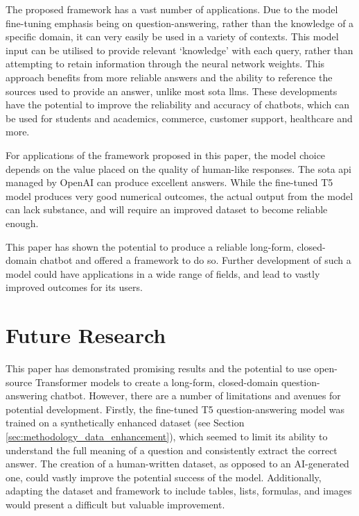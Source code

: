 The proposed framework has a vast number of applications. Due to the model fine-tuning emphasis being on question-answering, rather than the knowledge of a specific domain, it can very easily be used in a variety of contexts. This model input can be utilised to provide relevant `knowledge' with each query, rather than attempting to retain information through the neural network weights. This approach benefits from more reliable answers and the ability to reference the sources used to provide an answer, unlike most \acrlong{sota} \acrshort{llm}s. These developments have the potential to improve the reliability and accuracy of chatbots, which can be used for students and academics, commerce, customer support, healthcare and more.

For applications of the framework proposed in this paper, the model choice depends on the value placed on the quality of human-like responses. The \acrlong{sota} \acrshort{api} managed by OpenAI can produce excellent answers. While the fine-tuned T5 model produces very good numerical outcomes, the actual output from the model can lack substance, and will require an improved dataset to become reliable enough.

This paper has shown the potential to produce a reliable long-form, closed-domain chatbot and offered a framework to do so. Further development of such a model could have applications in a wide range of fields, and lead to vastly improved outcomes for its users.





\section{Future Research}

This paper has demonstrated promising results and the potential to use open-source Transformer models to create a long-form, closed-domain question-answering chatbot. However, there are a number of limitations and avenues for potential development. Firstly, the fine-tuned T5 question-answering model was trained on a synthetically enhanced dataset (see Section \ref{sec:methodology_data_enhancement}), which seemed to limit its ability to understand the full meaning of a question and consistently extract the correct answer. The creation of a human-written dataset, as opposed to an AI-generated one, could vastly improve the potential success of the model. Additionally, adapting the dataset and framework to include tables, lists, formulas, and images would present a difficult but valuable improvement.

